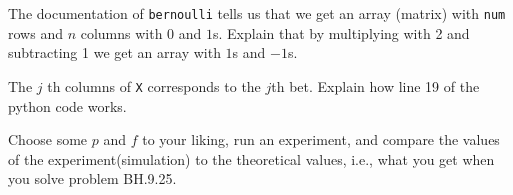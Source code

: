 \documentclass[assignments]{subfiles}
\begin{document}
\begin{exercise}
The documentation of \texttt{bernoulli} tells us that we get an array (matrix) with \texttt{num} rows and $n$ columns with $0$ and $1$s. Explain that by multiplying with 2 and subtracting 1 we get an array with $1$s and $-1$s.
\begin{solution}
\end{solution}
\end{exercise}

\begin{exercise}
The $j$ th columns of \texttt{X} corresponds to the $j$th bet. Explain how line 19 of the python code works.
\begin{solution}
\end{solution}
\end{exercise}

\begin{exercise}
Choose some $p$ and $f$ to your liking, run an experiment, and compare the values of the experiment(simulation) to the theoretical values, i.e., what you get when you solve  problem BH.9.25.
\begin{solution}
\end{solution}
\end{exercise}
\end{document}
